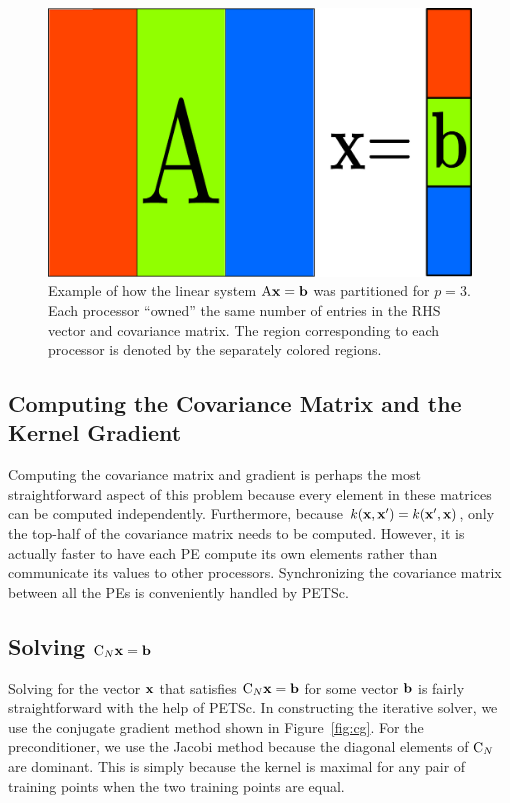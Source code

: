 \begin{figure}[t]
  \begin{center}
    \includegraphics[width=.4\textwidth]{figures/columns}
    \caption{
      {\small 
        Example of how the linear system $\mathrm{A}{\bf x} = {\bf b}$ was partitioned
        for $p = 3$.  Each processor ``owned'' the same number of entries in the
        \ac{RHS} vector and covariance matrix.  The region corresponding to each processor
        is denoted by the separately colored regions.
      }
    }
    \label{fig:partition}
  \end{center}
\end{figure}

\subsection{Computing the Covariance Matrix and the Kernel Gradient}

Computing the covariance matrix and gradient is perhaps the most straightforward aspect of
this problem because every element in these matrices can be computed independently.
Furthermore, because $k({\bf x}, {\bf x}') = k({\bf x}', {\bf x})$, only the top-half of
the covariance matrix needs to be computed.  However, it is actually faster to have each
\ac{PE} compute its own elements rather than communicate its values to other processors.
Synchronizing the covariance matrix between all the \acp{PE} is conveniently handled by
PETSc.

\subsection{Solving $\mathrm{C}_N {\bf x} = {\bf b}$}
\label{sub:solving}

Solving for the vector ${\bf x}$ that satisfies $\mathrm{C}_N {\bf x} = {\bf b}$ for some
vector ${\bf b}$ is fairly straightforward with the help of PETSc.  In constructing the
iterative solver, we use the conjugate gradient method shown in Figure~\ref{fig:cg}.  For
the preconditioner, we use the Jacobi method because the diagonal elements of $\mathrm{C}_N$
are dominant.  This is simply because the kernel is maximal for any pair of training
points when the two training points are equal.


